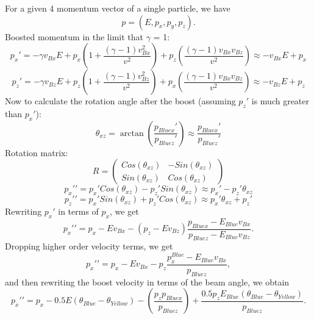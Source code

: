 \documentclass[12pt,oneside,openary]{article}
\begin{document}
For a given 4 momentum vector of a single particle, we have
\begin{equation}
p = (E,p_x,p_y,p_z).
\end{equation}
Boosted momentum in the limit that $\gamma$ = 1:
\begin{equation}
p_{x}\prime=-\gamma v_{Bx}E+p_x(1+\frac{(\gamma-1)v_{Bx}^2}{v^2})+p_z(\frac{(\gamma-1)v_{Bx}v_{Bz}}{v^2})\approx -v_{Bx}E+p_x
\end{equation}
\begin{equation}
p_{z}\prime=-\gamma v_{Bz}E+p_z(1+\frac{(\gamma-1)v_{Bz}^2}{v^2})+p_x(\frac{(\gamma-1)v_{Bx}v_{Bz}}{v^2})\approx -v_{Bz}E+p_z
\end{equation}
Now to calculate the rotation angle after the boost (assuming $p_z\prime$ is much greater than $p_x\prime$):
\begin{equation}
\theta_{xz}=\arctan(\frac{p_{Bluex}\prime}{p_{Bluez}\prime})\approx \frac{p_{Bluex}\prime}{p_{Bluez}\prime}
\end{equation}
Rotation matrix:
\[
R=
\begin{pmatrix}
    Cos(\theta_{xz})  & -Sin(\theta_{xz}) \\
     Sin(\theta_{xz})  & Cos(\theta_{xz})
\end{pmatrix}
\]
\begin{equation}
p_{x}\prime\prime = p_{x}\prime Cos(\theta_{xz})- p_{z}\prime Sin(\theta_{xz})\approx p_{x}\prime - p_z\prime \theta_{xz}
\end{equation}
\begin{equation}
p_{z}\prime\prime = p_{x}\prime Sin(\theta_{xz})+ p_{z}\prime Cos(\theta_{xz})\approx p_{x}\prime \theta_{xz} + p_z\prime 
\end{equation}
Rewriting $p_x\prime$ in terms of $p_x$, we get
\begin{equation}
p_{x}\prime\prime = p_{x} - E v_{Bx} - (p_z - E v_{Bz}) \frac{p_{Bluex} - E_{Blue} v_{Bx}}{p_{Bluez} - E_{Blue} v_{Bz}}.
\end{equation}
Dropping higher order velocity terms, we get
\begin{equation}
p_{x}\prime\prime = p_{x} - E v_{Bx} - p_z  \frac{p^{Blue}_{x} - E_{Blue} v_{Bx}}{p_{Bluez}},
\end{equation}
and then rewriting the boost velocity in terms of the beam angle, we obtain
\begin{equation}
p_{x}\prime\prime = p_{x} - 0.5 E (\theta_{Blue}-\theta_{Yellow}) - \left(\frac{p_z p_{Bluex}}{p_{Bluez}}\right)+\frac{0.5 p_{z}E_{Blue}(\theta_{Blue}-\theta_{Yellow})}{p_{Bluez}}.
\end{equation}
\end{document}
